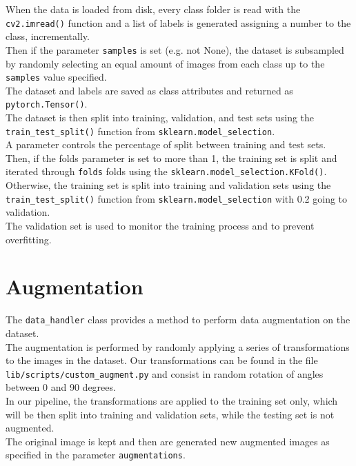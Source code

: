 \documentclass{report}
\begin{document}
When the data is loaded from disk, every class folder is read with the \texttt{cv2.imread()} function and a list of labels is generated assigning a number to the class, incrementally. \\
Then if the parameter \texttt{samples} is set (e.g. not None), the dataset is subsampled by randomly selecting an equal amount of images from each class up to the \texttt{samples} value specified. \\

The dataset and labels are saved as class attributes and returned as \texttt{pytorch.Tensor()}.\\

The dataset is then split into training, validation, and test sets using the \texttt{train\_test\_split()} function from \texttt{sklearn.model\_selection}. \\
A parameter controls the percentage of split between training and test sets. \\

Then, if the folds parameter is set to more than 1, the training set is split and iterated through \texttt{folds} folds using the \texttt{sklearn.model\_selection.KFold()}. \\
Otherwise, the training set is split into training and validation sets using the \texttt{train\_test\_split()} function from \texttt{sklearn.model\_selection} with 0.2 going to validation. \\
The validation set is used to monitor the training process and to prevent overfitting. \\

\section{Augmentation}
The \texttt{data\_handler} class provides a method to perform data augmentation on the dataset. \\
The augmentation is performed by randomly applying a series of transformations to the images in the dataset. Our transformations can be found in the file \texttt{lib/scripts/custom\_augment.py} and 
consist in random rotation of angles between 0 and 90 degrees.\\

In our pipeline, the transformations are applied to the training set only, which will be then split into training and validation sets, while the testing set is not augmented. \\
The original image is kept and then are generated new augmented images as specified in the parameter \texttt{augmentations}.\\
\end{document}
